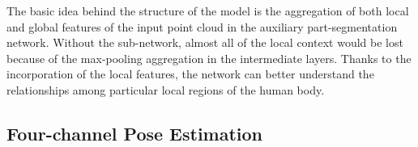 \noindent The basic idea behind the structure of the model is the aggregation of both local and global features of the input point cloud in the auxiliary part-segmentation network. Without the sub-network, almost all of the local context would be lost because of the max-pooling aggregation in the intermediate layers. Thanks to the incorporation of the local features, the network can better understand the relationships among particular local regions of the human body.\par
\vspace{5mm}


\subsection{Four-channel Pose Estimation}






